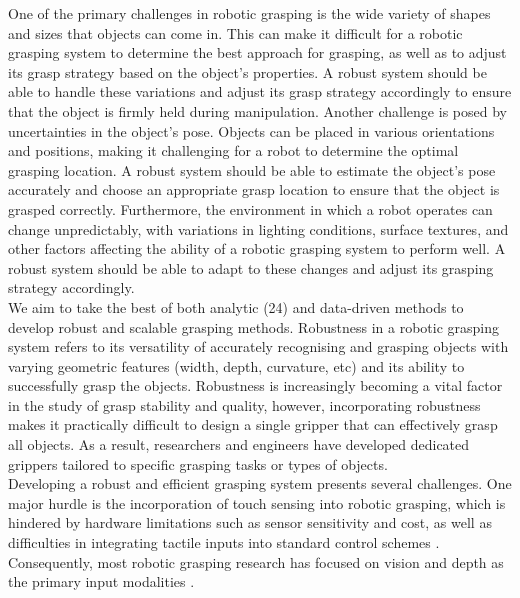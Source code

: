 \documentclass[11pt, a4paper]{report}
\begin{document}
One of the primary challenges in robotic grasping is the wide variety of shapes and sizes that objects can come in. This can make it difficult for a robotic grasping system to determine the best approach for grasping, as well as to adjust its grasp strategy based on the object's properties. A robust system should be able to handle these variations and adjust its grasp strategy accordingly to ensure that the object is firmly held during manipulation. Another challenge is posed by uncertainties in the object's pose. Objects can be placed in various orientations and positions, making it challenging for a robot to determine the optimal grasping location. A robust system should be able to estimate the object's pose accurately and choose an appropriate grasp location to ensure that the object is grasped correctly. Furthermore, the environment in which a robot operates can change unpredictably, with variations in lighting conditions, surface textures, and other factors affecting the ability of a robotic grasping system to perform well. A robust system should be able to adapt to these changes and adjust its grasping strategy accordingly.\\


We aim to take the best of both analytic (24) and data-driven methods \cite{berscheid2020selfsupervised, pinto2015supersizing} to develop robust and scalable grasping methods. Robustness in a robotic grasping system refers to its versatility of accurately recognising and grasping objects with varying geometric features (width, depth, curvature, etc) and its ability to successfully grasp the objects. Robustness is increasingly becoming a vital factor in the study of grasp stability and quality, however, incorporating robustness makes it practically difficult to design a single gripper that can effectively grasp all objects. As a result, researchers and engineers have developed dedicated grippers tailored to specific grasping tasks or types of objects.\\

Developing a robust and efficient grasping system presents several challenges. One major hurdle is the incorporation of touch sensing into robotic grasping, which is hindered by hardware limitations such as sensor sensitivity and cost, as well as difficulties in integrating tactile inputs into standard control schemes \cite{Calandra_2018}. Consequently, most robotic grasping research has focused on vision and depth as the primary input modalities \cite{Calandra_2018, de_Farias_2021}.\\
\end{document}
